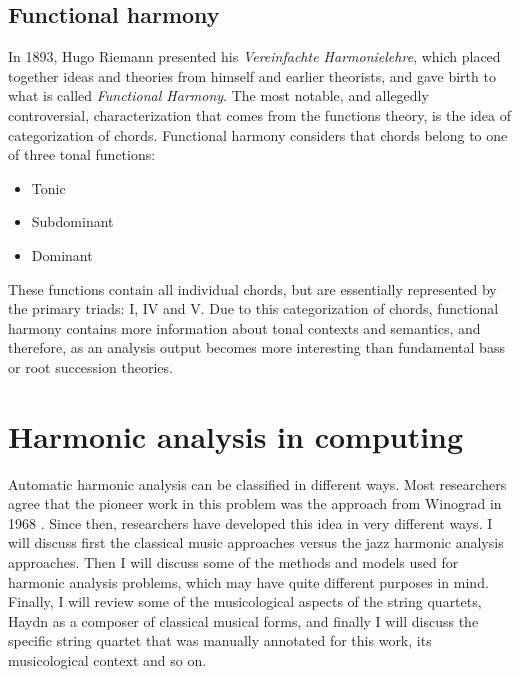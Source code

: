   \subsection{Functional harmony}
  In 1893, Hugo Riemann presented his \emph{Vereinfachte Harmonielehre}, which placed together ideas and theories from himself and earlier theorists, and gave birth to what is called \emph{Functional Harmony}. The most notable, and allegedly controversial, characterization that comes from the functions theory, is the idea of categorization of chords. Functional harmony considers that chords belong to one of three tonal functions:
  \begin{itemize}
    \item Tonic
    \item Subdominant
    \item Dominant
  \end{itemize}
  These functions contain all individual chords, but are essentially represented by the primary triads: I, IV and V.
  Due to this categorization of chords, functional harmony contains more information about tonal contexts and semantics, and therefore, as an analysis output becomes more interesting than fundamental bass or root succession theories.
\section{Harmonic analysis in computing}
  Automatic harmonic analysis can be classified in different ways. Most researchers agree that the pioneer work in this problem was the approach from Winograd in 1968 \cite{winograd1968linguistics}. Since then, researchers have developed this idea in very different ways. I will discuss first the classical music approaches versus the jazz harmonic analysis approaches. Then I will discuss some of the methods and models used for harmonic analysis problems, which may have quite different purposes in mind. Finally, I will review some of the musicological aspects of the string quartets, Haydn as a composer of classical musical forms, and finally I will discuss the specific string quartet that was manually annotated for this work, its musicological context and so on.
